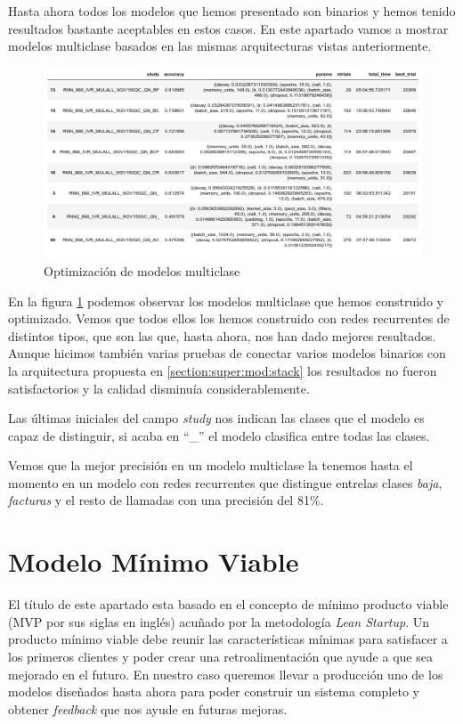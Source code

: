 Hasta ahora todos los modelos que hemos presentado son binarios y hemos tenido resultados bastante aceptables en estos casos. En este apartado vamos a mostrar modelos multiclase basados en las mismas arquitecturas vistas anteriormente.



\begin{figure}[!ht]
	\centering
	\includegraphics[width=1\textwidth]{images/super/opt_multi}
	\caption{Optimización de modelos multiclase}
	\label{fig:opt_multi}
\end{figure}

En la figura \ref{fig:opt_multi} podemos observar  los modelos multiclase que hemos construido y optimizado. Vemos que todos ellos los hemos construido con redes recurrentes de distintos tipos, que son las que, hasta ahora, nos han dado mejores resultados.  Aunque hicimos también  varias pruebas de conectar varios modelos binarios con la arquitectura propuesta en \ref{section:super:mod:stack} los resultados no fueron satisfactorios y la calidad disminuía considerablemente. 


Las últimas iniciales del campo \textit{study} nos indican las clases que el modelo es capaz de distinguir, si acaba en ``\_'' el modelo clasifica entre todas las clases.

Vemos que la mejor precisión en un modelo multiclase la tenemos hasta el momento en un modelo con redes recurrentes que distingue entrelas clases \textit{baja}, \textit{facturas} y el resto de llamadas con una precisión del 81\%.


\section{Modelo Mínimo Viable}
\label{section:super:mvm}
El título de este apartado esta basado en el concepto de mínimo producto viable (MVP por sus siglas en inglés) acuñado por la metodología \textit{Lean Startup}. Un producto mínimo viable debe reunir las características mínimas para satisfacer a los primeros clientes y poder crear una retroalimentación que ayude a que sea mejorado en el futuro. En nuestro caso queremos llevar a producción uno de los modelos diseñados hasta ahora para poder construir un sistema completo y obtener \textit{feedback} que nos ayude en futuras mejoras.

